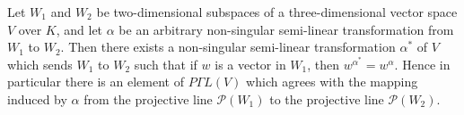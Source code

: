 Let $W_1$ and $W_2$ be two-dimensional subspaces of a three-dimensional vector space $V$ over $K$, and let $\alpha$ be an arbitrary non-singular semi-linear transformation from $W_1$ to $W_2$. Then there exists a non-singular semi-linear transformation $\alpha^*$ of $V$ which sends $W_1$ to $W_2$ such that if $w$ is a vector in $W_1$, then $w^{\alpha^*} = w^{\alpha}$. Hence in particular there is an element of $P\Gamma L(V)$ which agrees with the mapping induced by $\alpha$ from the projective line $\mathcal{P}(W_1)$ to the projective line $\mathcal{P}(W_2)$.
